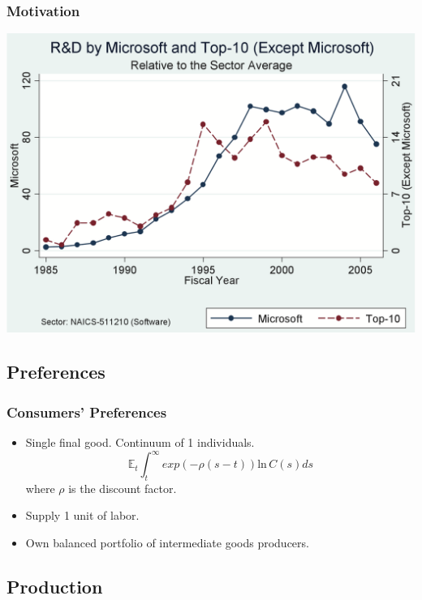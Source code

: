 \documentclass{beamer}
\begin{document}
\begin{frame}[t]\frametitle{Motivation}
    
\begin{center}
  \includegraphics[scale=.25]{microsoft_rd.png}
  \label{fig:}
\end{center}
\end{frame}


\subsection{Preferences}
\label{sub:preferences}

\begin{frame}[t]\frametitle{Consumers' Preferences} 
  \begin{itemize}
    \item<+-> Single final good.  Continuum of 1 individuals.
      \begin{equation*} \label{eq:pref}
        \mathbb{E}_t \int_t^\infty exp(-\rho(s - t))\mathrm{ln}\,   C(s)ds
      \end{equation*}
      where $\rho$ is the discount factor.
      
  \item<+-> Supply 1 unit of labor.
  \item<+-> Own balanced portfolio of intermediate goods producers.
  \end{itemize}
\end{frame}

\subsection{Production}
\label{sub:production}
\end{document}
